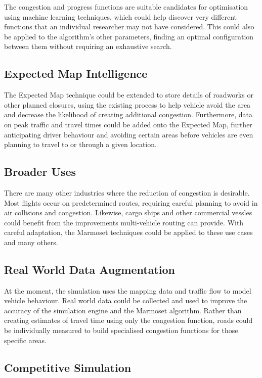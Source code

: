 \documentclass[ %
                    author={Alexander Hill},
                supervisor={Dr. Benjamin Sach},
                    degree={MEng},
                     title={MARMOSET},
                  subtitle={Multi-Agent Route Management using Online Simulation for Efficient Transportation},
                      type={research},
                      year={2016} ]{dissertation}
\begin{document}
The congestion and progress functions are suitable candidates for optimisation
using machine learning techniques, which could help discover very different
functions that an individual researcher may not have considered. This could also
be applied to the algorithm's other parameters, finding an optimal configuration
between them without requiring an exhaustive search.

\subsection*{Expected Map Intelligence}

The Expected Map technique could be extended to store details of roadworks or
other planned closures, using the existing process to help vehicle avoid the
area and decrease the likelihood of creating additional congestion. Furthermore,
data on peak traffic and travel times could be added onto the Expected Map,
further anticipating driver behaviour and avoiding certain areas before vehicles
are even planning to travel to or through a given location.

\subsection*{Broader Uses}

There are many other industries where the reduction of congestion is desirable.
Most flights occur on predetermined routes, requiring careful planning to avoid
in air collisions and congestion. Likewise, cargo ships and other commercial
vessles could benefit from the improvements multi-vehicle routing can provide.
With careful adaptation, the Marmoset techniques could be applied to these use
cases and many others.

\subsection*{Real World Data Augmentation}

At the moment, the simulation uses the mapping data and traffic flow to model
vehicle behaviour. Real world data could be collected and used to improve the
accuracy of the simulation engine and the Marmoset algorithm. Rather than
creating estimates of travel time using only the congestion function, roads
could be individually measured to build specialised congestion functions for
those specific areas.

\subsection*{Competitive Simulation}
\end{document}
